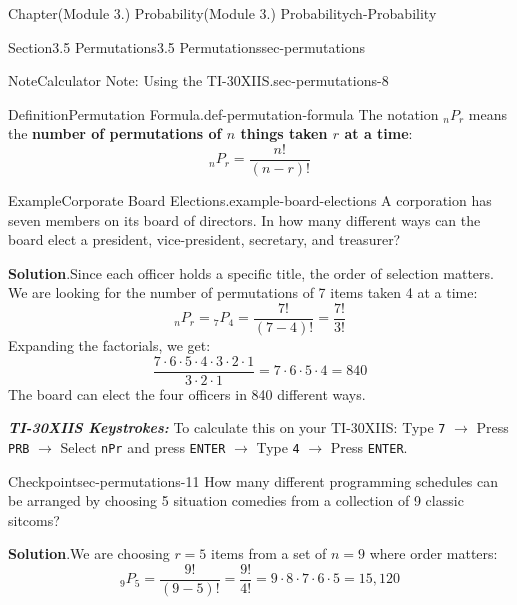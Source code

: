 \documentclass[oneside,10pt,]{book}
\newcommand{\blocktitlefont}{\relax}
\newcommand{\mono}[1]{\texttt{#1}}
\newcommand{\alert}[1]{\textbf{\textit{#1}}}
\newcommand{\terminology}[1]{\textbf{#1}}
\begin{document}
\begin{chapterptx}{Chapter}{(Module 3.) Probability}{}{(Module 3.) Probability}{}{}{ch-Probability}
\begin{sectionptx}{Section}{3.5 Permutations}{}{3.5 Permutations}{}{}{sec-permutations}
\begin{note}{Note}{Calculator Note: Using the TI-30XIIS.}{sec-permutations-8}
\begin{enumerate}
\end{enumerate}
%
\end{note}
\begin{definition}{Definition}{Permutation Formula.}{def-permutation-formula}%
The notation \({}_n P_r\) means the \terminology{number of permutations of \(n\) things taken \(r\) at a time}:%
\begin{equation*}
{}_n P_r = \frac{n!}{(n-r)!}
\end{equation*}
%
\end{definition}
\begin{example}{Example}{Corporate Board Elections.}{example-board-elections}%
A corporation has seven members on its board of directors. In how many different ways can the board elect a president, vice-president, secretary, and treasurer?%
\par\smallskip%
\noindent\textbf{\blocktitlefont Solution}.\hypertarget{example-board-elections-3}{}\quad{}Since each officer holds a specific title, the order of selection matters. We are looking for the number of permutations of 7 items taken 4 at a time:%
\begin{equation*}
{}_{n}P_r = {}_{7}P_4 = \frac{7!}{(7-4)!} = \frac{7!}{3!}
\end{equation*}
Expanding the factorials, we get:%
\begin{equation*}
\frac{7 \cdot 6 \cdot 5 \cdot 4 \cdot 3 \cdot 2 \cdot 1}{3 \cdot 2 \cdot 1} = 7 \cdot 6 \cdot 5 \cdot 4 = 840
\end{equation*}
The board can elect the four officers in 840 different ways.%
\par
\alert{TI-30XIIS Keystrokes:} To calculate this on your TI-30XIIS: Type \mono{7} \(\rightarrow\) Press \mono{PRB} \(\rightarrow\) Select \mono{nPr} and press \mono{ENTER} \(\rightarrow\) Type \mono{4} \(\rightarrow\) Press \mono{ENTER}.%
\end{example}
\begin{inlineexercise}{Checkpoint}{}{sec-permutations-11}%
How many different programming schedules can be arranged by choosing 5 situation comedies from a collection of 9 classic sitcoms?%
\par\smallskip%
\noindent\textbf{\blocktitlefont Solution}.\hypertarget{sec-permutations-11-2}{}\quad{}We are choosing \(r=5\) items from a set of \(n=9\) where order matters:%
\begin{equation*}
{}_9 P_5 = \frac{9!}{(9-5)!} = \frac{9!}{4!} = 9 \cdot 8 \cdot 7 \cdot 6 \cdot 5 = 15,120
\end{equation*}

\end{inlineexercise}
\end{sectionptx}
\end{chapterptx}
\end{document}
